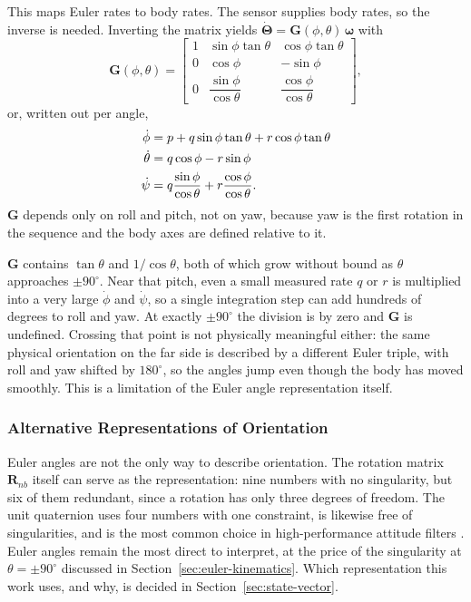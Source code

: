 \documentclass[12pt,a4paper]{article}
\newcommand{\bG}{\bm{G}}
\newcommand{\bomega}{\bm{\omega}}
\newcommand{\bTheta}{\bm{\Theta}}
\begin{document}
This maps Euler rates to body rates. The sensor supplies body rates,
so the inverse is needed. Inverting the matrix yields
$\dot{\bTheta} = \bG(\phi,\theta)\,\bomega$ with
\begin{equation}
  \bG(\phi,\theta) =
  \begin{bmatrix}
    1 & \sin\phi\tan\theta & \cos\phi\tan\theta \\
    0 & \cos\phi           & -\sin\phi           \\
    0 & \dfrac{\sin\phi}{\cos\theta} & \dfrac{\cos\phi}{\cos\theta}
  \end{bmatrix},
  \label{eq:G}
\end{equation}
or, written out per angle,
\begin{align}
  \dot{\phi}   &= p + q\sin\phi\tan\theta + r\cos\phi\tan\theta \notag\\
  \dot{\theta} &= q\cos\phi - r\sin\phi \notag\\
  \dot{\psi}   &= q\frac{\sin\phi}{\cos\theta} + r\frac{\cos\phi}{\cos\theta}.
  \label{eq:euler_rates}
\end{align}
$\bG$ depends only on roll and pitch, not on yaw, because yaw is the
first rotation in the sequence and the body axes are defined
relative to it.

\begin{notebox}[title=Gimbal lock]
  \label{note:gimbal_lock}
  $\bG$ contains $\tan\theta$ and $1/\cos\theta$, both of which grow
  without bound as $\theta$ approaches $\pm 90^{\circ}$. Near that
  pitch, even a small measured rate $q$ or $r$ is multiplied into a
  very large $\dot{\phi}$ and $\dot{\psi}$, so a single integration
  step can add hundreds of degrees to roll and yaw. At exactly
  $\pm 90^{\circ}$ the division is by zero and $\bG$ is undefined.
  Crossing that point is not physically meaningful either: the same
  physical orientation on the far side is described by a different
  Euler triple, with roll and yaw shifted by $180^{\circ}$, so the
  angles jump even though the body has moved smoothly. This is a
  limitation of the Euler angle representation itself.
\end{notebox}

\subsubsection{Alternative Representations of Orientation}
\label{sec:orientation-representations}

Euler angles are not the only way to describe orientation. The
rotation matrix $\bm{R}_{nb}$ itself can serve as the
representation: nine numbers with no singularity, but six of them
redundant, since a rotation has only three degrees of freedom. The
unit quaternion uses four numbers with one constraint, is likewise
free of singularities, and is the most common choice in
high-performance attitude filters
\citep{groves2013principles,crassidis2007survey}. Euler angles
remain the most direct to interpret, at the price of the singularity
at $\theta = \pm 90^{\circ}$ discussed in
Section~\ref{sec:euler-kinematics}. Which representation this work
uses, and why, is decided in Section~\ref{sec:state-vector}.
\end{document}

